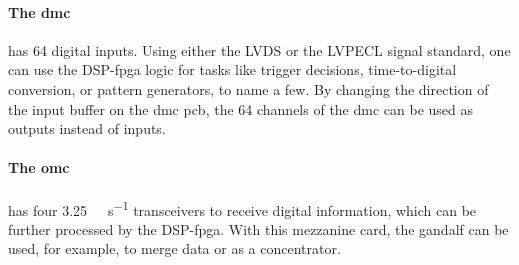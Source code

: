 \paragraph{The \ac{dmc}} has 64 digital inputs. 
Using either the LVDS or the LVPECL signal standard, one can use the DSP-\ac{fpga} logic for tasks like trigger decisions, time-to-digital conversion, or pattern generators, to name a few.
By changing the direction of the input buffer on the \ac{dmc} \ac{pcb}, the 64 channels of the \ac{dmc} can be used as outputs instead of inputs.

\paragraph{The \ac{omc}} has four \SI{3.25}{\giga\bit\per\second} transceivers to receive digital information, which can be further processed by the DSP-\ac{fpga}.
With this mezzanine card, the \ac{gandalf} can be used, for example, to merge data or as a concentrator.

